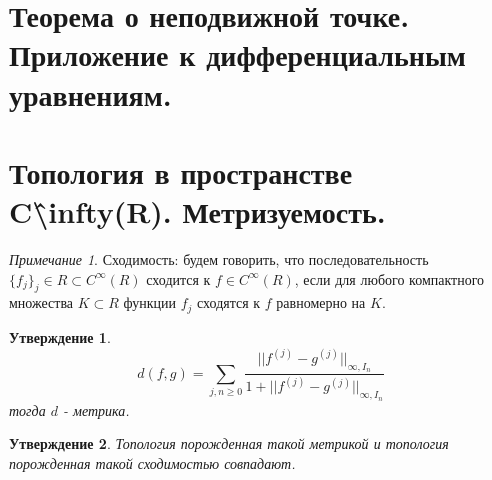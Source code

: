 \documentclass{article}
\theoremstyle{indented}
\newtheorem{stat}{Утверждение}
\theoremstyle{definition}
\theoremstyle{remark}
\newtheorem{remark}{Примечание}
\begin{document}
\section{Теорема о неподвижной точке. Приложение к дифференциальным уравнениям.}

\section{Топология в пространстве C\^ \textbackslash infty(R). Метризуемость.}

\begin{remark}
    Сходимость: будем говорить, что последовательность
    $\{f_j\}_j\in R \subset C^\infty(R)$ сходится к $f \in C^\infty(R)$, 
    если для любого компактного множества $K \subset R$ функции $f_j$
    сходятся к $f$ равномерно на $K$.
\end{remark}

\begin{stat}
    $$
    d(f,g) = \sum\limits_{j,n\geq 0} \frac{||f^{(j)}-g^{(j)}||_{\infty, I_n}}{1+||f^{(j)}-g^{(j)}||_{\infty, I_n}}
    $$
    тогда $d$ - метрика.
\end{stat}

\begin{stat}
    Топология порожденная такой метрикой и топология порожденная такой сходимостью совпадают.
\end{stat}
\newpage
\hypertarget{t2}{}
\printindex
\end{document}
